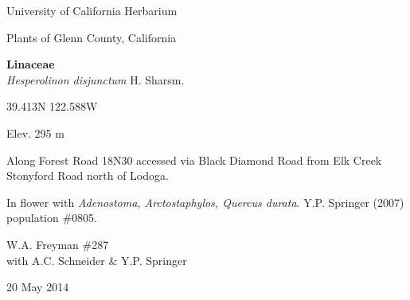 \documentclass[letterpaper,10pt]{article}
\begin{document}
\begin{minipage}[t]{0.40\textwidth}

\begin{center}
University of California Herbarium \\
\begin{large}
Plants of Glenn County, California \\
\end{large}
\vspace{\baselineskip}
\textbf{Linaceae} \\
\textit{Hesperolinon disjunctum} H. Sharsm.\\
\end{center}

\begin{footnotesize}

\begin{multicols}{2}
39.413\textdegree N 122.588\textdegree W
\columnbreak
\begin{flushright}
Elev. 295 m
\end{flushright}
\end{multicols}

Along Forest Road 18N30 accessed via Black Diamond Road from Elk Creek Stonyford Road north of Lodoga.
\vspace{\baselineskip}

In flower with \textit{Adenostoma, Arctostaphylos, Quercus durata}. Y.P. Springer (2007) population \#0805.

\begin{multicols}{2}
W.A. Freyman \#287 \\
with A.C. Schneider \& Y.P. Springer
\columnbreak
\begin{flushright}
20 May 2014
\end{flushright}
\end{multicols}

\end{footnotesize}

\end{minipage}

\vspace{2cm}
%
%

%
%
\end{document}
